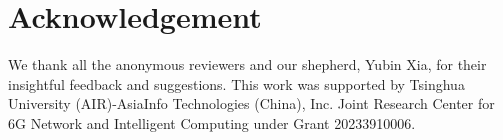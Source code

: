 \section{Acknowledgement}

We thank all the anonymous reviewers and our shepherd, Yubin Xia, for their insightful feedback and suggestions. This work was supported by Tsinghua University (AIR)-AsiaInfo Technologies (China), Inc. Joint Research Center for 6G Network and Intelligent Computing under Grant 20233910006.